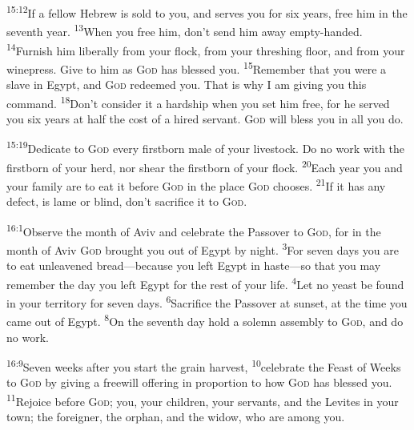 \documentclass[openany,12pt,english]{book}
\newenvironment{para}{\par\pretolerance=100\tolerance=200\setlength{\emergencystretch}{0.6em}\relax}{\par}
\begin{document}
\begin{para}
    \textsuperscript{15:12}\thinspace{}If a fel\-low Hebrew is sold to you, and serves you for six years, free him in the sev\-enth year.
    \textsuperscript{13}\thinspace{}When you free him, don't send him a\-way empty-handed.
    \textsuperscript{14}\thinspace{}Fur\-nish him lib\-er\-al\-ly from your flock, from your threshing floor, and from your wine\-press. Give to him as \textsc{God} has bless\-ed you.
    \textsuperscript{15}\thinspace{}Re\-mem\-ber that you were a slave in Egypt, and \textsc{God} redeemed you. That is why I am giv\-ing you this com\-mand.
    \textsuperscript{18}\thinspace{}Don't con\-sid\-er it a hard\-ship when you set him free, for he served you six years at half the cost of a hired serv\-ant. \textsc{God} will bless you in all you do.
\end{para}

\begin{para}
    \textsuperscript{15:19}\thinspace{}Ded\-i\-cate to \textsc{God} eve\-ry firstborn male of your live\-stock. Do no work with the firstborn of your herd, nor shear the firstborn of your flock.
    \textsuperscript{20}\thinspace{}Each year you and your fam\-i\-ly are to eat it be\-fore \textsc{God} in the place \textsc{God} chooses.
    \textsuperscript{21}\thinspace{}If it has any de\-fect, is lame or blind, don't sac\-ri\-fice it to \textsc{God}.
\end{para}

\bigskip{}

\begin{para}
    \textsuperscript{16:1}\thinspace{}Ob\-serve the month of Aviv and cel\-e\-brate the Passover to \textsc{God}, for in the month of Aviv \textsc{God} brought you out of Egypt by night.
    \textsuperscript{3}\thinspace{}For sev\-en days you are to eat un\-leav\-ened bread---be\-cause you left Egypt in haste---so that you may re\-mem\-ber the day you left Egypt for the rest of your life.
    \textsuperscript{4}\thinspace{}Let no yeast be found in your ter\-ri\-to\-ry for sev\-en days.
    \textsuperscript{6}\thinspace{}Sac\-ri\-fice the Passover at sun\-set, at the time you came out of Egypt.
    \textsuperscript{8}\thinspace{}On the sev\-enth day hold a sol\-emn as\-sem\-bly to \textsc{God}, and do no work.
\end{para}

\begin{para}
    \textsuperscript{16:9}\thinspace{}Sev\-en weeks af\-ter you start the grain har\-vest,
    \textsuperscript{10}\thinspace{}cel\-e\-brate the Feast of Weeks to \textsc{God} by giv\-ing a free\-will of\-fer\-ing in pro\-por\-tion to how \textsc{God} has bless\-ed you.
    \textsuperscript{11}\thinspace{}Re\-joice be\-fore \textsc{God}; you, your chil\-dren, your servants, and the Levites in your town; the for\-eign\-er, the or\-phan, and the wid\-ow, who are a\-mong you.
\end{para}
\end{document}

